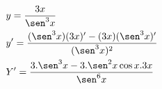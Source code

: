 \begin{ex}
\begin{align}
&y=\frac{3x}{\sen^3{x}}\nonumber\\
&y'=\frac{(\sen^3{x})(3x)'-(3x)(\sen^3{x})'}{(\sen^3{x})^2}\nonumber\\
&Y'=\frac{3.\sen^3{x}-3.\sen^2{x}\cos{x}.3x}{\sen^6{x}}\nonumber
\end{align}
\end{ex}